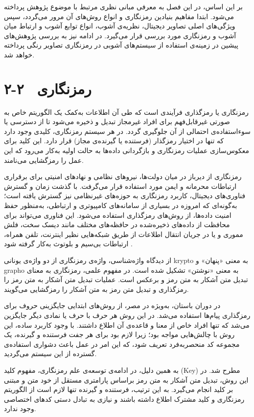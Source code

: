 بر این اساس، در این فصل به معرفی مبانی نظری مرتبط با موضوع پژوهش پرداخته می‌شود. ابتدا مفاهیم بنیادین رمزنگاری و انواع روش‌های آن مرور می‌گردد، سپس ویژگی‌های اصلی تصاویر دیجیتال، نظریه‌ی آشوب، انواع توابع آشوب و ارتباط میان آشوب و رمزنگاری مورد بررسی قرار می‌گیرد. در ادامه نیز به بررسی پژوهش‌های پیشین در زمینه‌ی استفاده از سیستم‌های آشوبی در رمزنگاری تصاویر رنگی پرداخته خواهد شد.

\section{۲-۲  رمزنگاری}

رمزنگاری یا رمزگذاری فرآیندی است که طی آن اطلاعات به‌کمک یک الگوریتم خاص به صورتی غیرقابل‌فهم برای افراد غیرمجاز تبدیل و ذخیره می‌شود تا از دسترسی یا سوء‌استفاده‌ی احتمالی از آن جلوگیری گردد. در هر سیستم رمزنگاری، کلیدی وجود دارد که تنها در اختیار رمزگذار (فرستنده یا گیرنده‌ی مجاز) قرار دارد. این کلید برای معکوس‌سازی عملیات رمزنگاری و بازگردانی داده‌ها به حالت اولیه به‌کار می‌رود که این عمل را رمزگشایی می‌نامند.

رمزنگاری از دیرباز در میان دولت‌ها، نیروهای نظامی و نهادهای امنیتی برای برقراری ارتباطات محرمانه و ایمن مورد استفاده قرار می‌گرفت. با گذشت زمان و گسترش فناوری‌های دیجیتال، کاربرد رمزنگاری به حوزه‌های غیرنظامی نیز گسترش یافته است؛ به‌گونه‌ای که امروزه در بسیاری از سامانه‌های کامپیوتری و ارتباطی، به‌منظور حفظ امنیت داده‌ها، از روش‌های رمزگذاری استفاده می‌شود. این فناوری می‌تواند برای محافظت از داده‌های ذخیره‌شده در حافظه‌های مختلف مانند دیسک سخت، فلش مموری و یا در جریان انتقال اطلاعات از طریق شبکه‌هایی نظیر اینترنت، تلفن همراه، ارتباطات بی‌سیم و بلوتوث به‌کار گرفته شود \cite{ref14}.

از دیدگاه واژه‌شناسی، واژه‌ی رمزنگاری از دو واژه‌ی یونانی ‎krypto‎ به معنی «پنهان» و ‎grapho‎ به معنی «نوشتن» تشکیل شده است. در مفهوم علمی، رمزنگاری به معنای تبدیل متن آشکار  به متن رمز و برعکس است. عملیات تبدیل متن آشکار به متن رمز را رمزگذاری و تبدیل متن رمز به متن آشکار را رمزگشایی می‌گویند.

در دوران باستان، به‌ویژه در مصر، از روش‌های ابتدایی جایگزینی حروف برای رمزگذاری پیام‌ها استفاده می‌شد. در این روش هر حرف با حرف یا نمادی دیگر جایگزین می‌شد که تنها افراد خاص از معنا و قاعده‌ی آن اطلاع داشتند. با وجود کاربرد ساده، این روش با چالش‌هایی مواجه بود؛ زیرا لازم بود برای هر جفت فرستنده و گیرنده، یک مجموعه کد منحصربه‌فرد تعریف شود، که این امر در عمل باعث دشواری استفاده‌ی گسترده از این سیستم می‌گردید\cite{ref15}.

به همین دلیل، در ادامه‌ی توسعه‌ی علم رمزنگاری، مفهوم کلید (‎Key‎) مطرح شد. در این روش، تبدیل متن آشکار به متن رمز براساس پارامتری مستقل از خود متن و مبتنی بر کلید انجام می‌گیرد. به این ترتیب، فرستنده و گیرنده تنها لازم است از الگوریتم رمزنگاری و کلید مشترک اطلاع داشته باشند و نیازی به تبادل دستی کدهای اختصاصی وجود ندارد.

